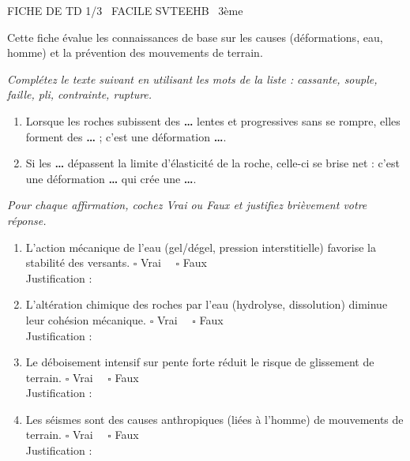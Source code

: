 \documentclass[11pt]{article}
\begin{document}
\begin{tcolorbox}[enhanced,colback=popink,colframe=popink,arc=10pt,boxrule=0pt,left=12pt,right=12pt,top=9pt,bottom=9pt]
{\color{white}\popxbold\small FICHE DE TD 1/3 \textbullet\ FACILE \hfill SVTEEHB \textbullet\ 3ème\par}
\end{tcolorbox}
\vspace{4pt}
Cette fiche évalue les connaissances de base sur les causes (déformations, eau, homme) et la prévention des mouvements de terrain.

\begin{exercice}
\emph{Complétez le texte suivant en utilisant les mots de la liste :} \textit{cassante, souple, faille, pli, contrainte, rupture.}

\begin{enumerate}
    \item Lorsque les roches subissent des \textbf{\dots} lentes et progressives sans se rompre, elles forment des \textbf{\dots} ; c'est une déformation \textbf{\dots}.
    \item Si les \textbf{\dots} dépassent la limite d'élasticité de la roche, celle-ci se brise net : c'est une déformation \textbf{\dots} qui crée une \textbf{\dots}.
\end{enumerate}
\end{exercice}

\begin{exercice}
\emph{Pour chaque affirmation, cochez Vrai ou Faux et justifiez brièvement votre réponse.}

\begin{enumerate}
    \item L'action mécanique de l'eau (gel/dégel, pression interstitielle) favorise la stabilité des versants. \hfill $\square$ Vrai $\quad \square$ Faux \\
    Justification : \dotfill
    \item L'altération chimique des roches par l'eau (hydrolyse, dissolution) diminue leur cohésion mécanique. \hfill $\square$ Vrai $\quad \square$ Faux \\
    Justification : \dotfill
    \item Le déboisement intensif sur pente forte réduit le risque de glissement de terrain. \hfill $\square$ Vrai $\quad \square$ Faux \\
    Justification : \dotfill
    \item Les séismes sont des causes anthropiques (liées à l'homme) de mouvements de terrain. \hfill $\square$ Vrai $\quad \square$ Faux \\
    Justification : \dotfill
\end{enumerate}
\end{exercice}
\end{document}
